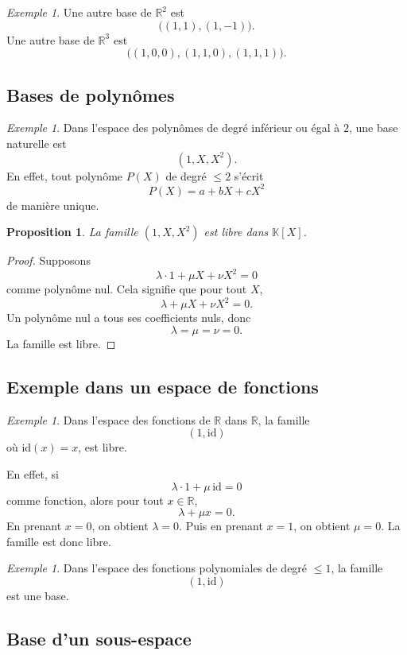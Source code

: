 \documentclass[11pt,a4paper]{article}
\newtheorem{proposition}[definition]{Proposition}
\theoremstyle{remark}
\newtheorem{exemple}[definition]{Exemple}
\newcommand{\R}{\mathbb{R}}
\newcommand{\K}{\mathbb{K}}
\begin{document}
\begin{exemple}
Une autre base de \(\R^2\) est
\[
\big((1,1),(1,-1)\big).
\]
Une autre base de \(\R^3\) est
\[
\big((1,0,0),(1,1,0),(1,1,1)\big).
\]
\end{exemple}

\subsection{Bases de polynômes}

\begin{exemple}
Dans l’espace des polynômes de degré inférieur ou égal à \(2\), une base naturelle est
\[
(1,X,X^2).
\]
En effet, tout polynôme \(P(X)\) de degré \(\le 2\) s’écrit
\[
P(X)=a+bX+cX^2
\]
de manière unique.
\end{exemple}

\begin{proposition}
La famille \((1,X,X^2)\) est libre dans \(\K[X]\).
\end{proposition}

\begin{proof}
Supposons
\[
\lambda\cdot 1+\mu X+\nu X^2=0
\]
comme polynôme nul. Cela signifie que pour tout \(X\),
\[
\lambda+\mu X+\nu X^2=0.
\]
Un polynôme nul a tous ses coefficients nuls, donc
\[
\lambda=\mu=\nu=0.
\]
La famille est libre.
\end{proof}

\subsection{Exemple dans un espace de fonctions}

\begin{exemple}
Dans l’espace des fonctions de \(\R\) dans \(\R\), la famille
\[
(1,\mathrm{id})
\]
où \(\mathrm{id}(x)=x\), est libre.

En effet, si
\[
\lambda\cdot 1+\mu\,\mathrm{id}=0
\]
comme fonction, alors pour tout \(x\in\R\),
\[
\lambda+\mu x=0.
\]
En prenant \(x=0\), on obtient \(\lambda=0\). Puis en prenant \(x=1\), on obtient \(\mu=0\). La famille est donc libre.
\end{exemple}

\begin{exemple}
Dans l’espace des fonctions polynomiales de degré \(\le 1\), la famille
\[
(1,\mathrm{id})
\]
est une base.
\end{exemple}

\subsection{Base d’un sous-espace}
\end{document}

